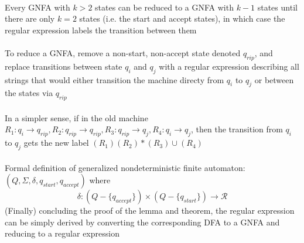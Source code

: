 \documentclass{article}
\newcommand*{\<}{\langle}
\renewcommand*{\>}{\rangle}
\begin{document}
			\\
			Every GNFA with $k > 2$ states can be reduced to a GNFA with $k - 1$ states until there are only $k = 2$ states (i.e. the start and accept states), in which case the regular expression labels the transition between them \\
			\\
			To reduce a GNFA, remove a non-start, non-accept state denoted $q_{rip}$, and replace transitions between state $q_i$ and $q_j$ with a regular expression describing all strings that would either transition the machine directy from $q_i$ to $q_j$ or between the states via $q_{rip}$ \\
			\\
			In a simpler sense, if in the old machine $R_1: q_i \to q_{rip}, R_2: q_{rip} \to q_{rip}, R_3: q_{rip} \to q_j, R_4: q_i \to q_j$, then the transition from $q_i$ to $q_j$ gets the new label $(R_1)(R_2)*(R_3) \cup (R_4)$ \\
			\\
			Formal definition of generalized nondeterministic finite automaton: $(Q, \Sigma, \delta, q_{start}, q_{accept})$ where
			\begin{equation}
				\delta : (Q - \{q_{accept}\}) \times (Q - \{q_{start}\}) \to \mathcal{R}
				\end{equation}
			(Finally) concluding the proof of the lemma and theorem, the regular expression can be simply derived by converting the corresponding DFA to a GNFA and reducing to a regular expression
\end{document}
